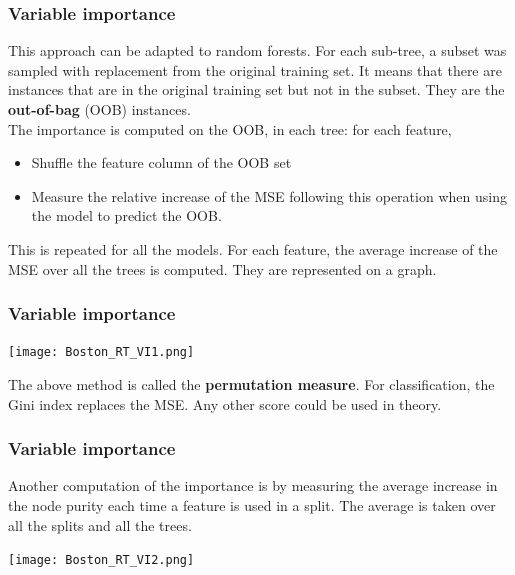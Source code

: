 \begin{frame}
\frametitle{Variable importance}
This approach can be adapted to random forests. For each sub-tree, a subset was sampled with replacement from the original training set. It means that there are instances that are in the original training set but not in the subset. They are the {\bf out-of-bag} (OOB) instances. \\
\vspace{0.3cm}
The importance is computed on the OOB, in each tree: for each feature, 
\begin{itemize}
\item Shuffle the feature column of the OOB set
\item Measure the relative increase of the MSE following this operation when using the model to predict the OOB.
\end{itemize}
This is repeated for all the models. For each feature, the average increase of the MSE over all the trees is computed. They are represented on a graph.
\end{frame}
\begin{frame}
\frametitle{Variable importance}
\begin{center}
\texttt{[image: Boston\_RT\_VI1.png]}
\end{center}
The above method is called the {\bf permutation measure}. For classification, the Gini index replaces the MSE. Any other score could be used in theory.
\end{frame}
\begin{frame}
\frametitle{Variable importance}
Another computation of the importance is by measuring the average increase in the node purity each time a feature is used in a split. The average is taken over all the splits and all the trees. 
\begin{center}
\texttt{[image: Boston\_RT\_VI2.png]}
\end{center}
\end{frame}



